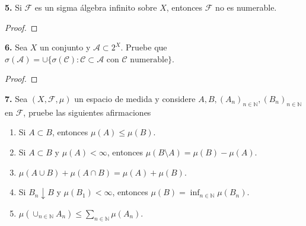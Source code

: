 \documentclass{article}
\newenvironment{statement}[1]{\smallskip\noindent\color[rgb]{1.00,0.00,0.50} {\bf #1.}}{}
\theoremstyle{definition}
\theoremstyle{remark}
\newcommand{\BN}{\mathbb N}
\begin{document}
\begin{statement}{5}
  Si $\mathcal{F}$ es un sigma \'algebra infinito sobre $X$, entonces $\mathcal{F}$ no es numerable.
\end{statement}

\begin{proof}
\end{proof}

\begin{statement}{6}
  Sea $X$ un conjunto y $\mathcal{A} \subset 2^X$. Pruebe que $\sigma(\mathcal{A}) = \cup \{\sigma(\mathcal{C}) : \mathcal{C} \subset \mathcal{A} \text{ con } \mathcal{C} \text{ numerable}\}$.
\end{statement}

\begin{proof}
\end{proof}

\begin{statement}{7}
  Sea $(X, \mathcal{F}, \mu)$ un espacio de medida y considere $A, B, (A_n)_{n \in \BN}, (B_n)_{n \in \BN}$ en $\mathcal{F}$, pruebe las siguientes afirmaciones
  \begin{enumerate}
    \item Si $A \subset B$, entonces $\mu(A) \leq \mu(B)$.
    \item Si $A \subset B$ y $\mu(A) < \infty$, entonces $\mu(B \setminus A) = \mu(B) - \mu(A)$.
    \item $\mu(A \cup B) + \mu(A \cap B) = \mu(A) + \mu(B)$.
    \item Si $B_n \downarrow B$ y $\mu(B_1) < \infty$, entonces $\mu(B) = \inf_{n \in \BN} \mu(B_n)$.
    \item $\mu(\cup_{n \in \BN} A_n) \leq \sum_{n \in \BN} \mu(A_n)$.
  \end{enumerate}
\end{statement}
\end{document}
